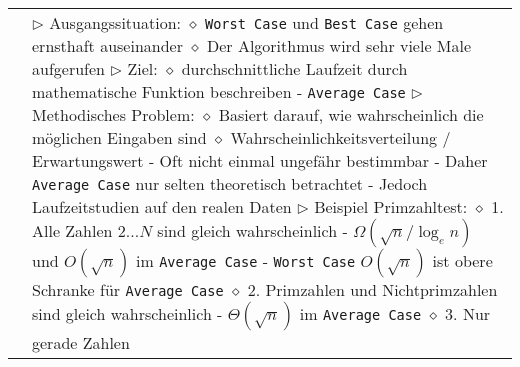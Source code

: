 \begin{longtable}{ | p{} p{} | }
	\makecell[l]{Average Case} & \makecell[l]{
	$\rhd$ Ausgangssituation: \\
	\hspace{0.4cm} $\diamond$ \texttt{Worst Case} und \texttt{Best Case} gehen ernsthaft auseinander \\ 
	\hspace{0.4cm} $\diamond$ Der Algorithmus wird sehr viele Male aufgerufen \\
	$\rhd$ Ziel: \\
	\hspace{0.4cm} $\diamond$ durchschnittliche Laufzeit durch mathematische Funktion beschreiben \\
	\hspace{0.6cm} - \texttt{Average Case} \\
	$\rhd$ Methodisches Problem: \\
	\hspace{0.4cm} $\diamond$ Basiert darauf, wie wahrscheinlich die möglichen Eingaben sind \\
	\hspace{0.4cm} $\diamond$ Wahrscheinlichkeitsverteilung / Erwartungswert \\
	\hspace{0.6cm} - Oft nicht einmal ungefähr bestimmbar \\
	\hspace{0.6cm} - Daher \texttt{Average Case} nur selten theoretisch betrachtet \\
	\hspace{0.6cm} - Jedoch Laufzeitstudien auf den realen Daten \\
	$\rhd$ Beispiel Primzahltest: \\
	\hspace{0.4cm} $\diamond$ 1. Alle Zahlen $2...N$ sind gleich wahrscheinlich \\
	\hspace{0.6cm} - $\Omega(\sqrt{n} / \log_e n)$ und $O(\sqrt{n})$ im \texttt{Average Case} \\
	\hspace{0.6cm} - \texttt{Worst Case} $O(\sqrt{n})$ ist obere Schranke für \texttt{Average Case} \\
	\hspace{0.4cm} $\diamond$ 2. Primzahlen und Nichtprimzahlen sind gleich wahrscheinlich \\
	\hspace{0.6cm} - $\Theta(\sqrt{n})$ im \texttt{Average Case} \\
	\hspace{0.4cm} $\diamond$ 3. Nur gerade Zahlen \\
}
\end{longtable}
